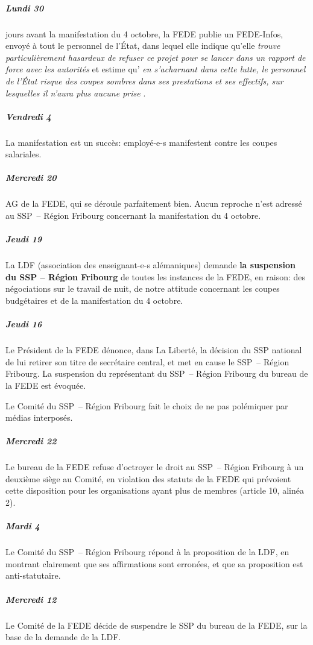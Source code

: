 \subparagraph{Lundi 30}%
 jours avant la manifestation du 4 octobre, la FEDE publie un FEDE-Infos, envoyé à tout le
	personnel de l'État, dans lequel elle indique qu'elle
		\og \emph{trouve particulièrement hasardeux de refuser ce projet pour se lancer dans un
			rapport de force avec les autorités} \fg
	et estime qu'%
		\og \emph{en s'acharnant dans cette lutte, le personnel de l'État risque des coupes sombres
		dans ses prestations et ses effectifs, sur lesquelles il n'aura plus aucune prise} \fg.

\subparagraph{Vendredi 4}%
La manifestation est un succès:  employé-e-s manifestent contre les coupes salariales.

\subparagraph{Mercredi 20}%
AG de la FEDE, qui se déroule parfaitement bien.
Aucun reproche n'est adressé au SSP~– Région Fribourg concernant la manifestation du 4 octobre.

\subparagraph{Jeudi 19}%
La LDF (association des enseignant-e-s alémaniques)
demande \textbf{la suspension du SSP – Région Fribourg} de toutes les instances de la FEDE,
	en raison:
des négociations sur le travail de nuit, de notre attitude concernant les \og coupes budgétaires \fg
	et de la manifestation du 4 octobre.

\subparagraph{Jeudi 16}%
Le Président de la FEDE dénonce,
	dans La Liberté,
	la décision du SSP national de lui retirer son titre de secrétaire central,
	et met en cause le SSP~– Région Fribourg.
La suspension du représentant du SSP~– Région Fribourg du bureau de la FEDE est évoquée.

Le Comité du SSP~– Région Fribourg fait le choix de ne pas polémiquer par médias interposés.

\subparagraph{Mercredi 22}%
Le bureau de la FEDE refuse d'octroyer le droit au SSP~– Région Fribourg à un deuxième siège au
	Comité, en violation des statuts de la FEDE qui prévoient cette disposition pour les organisations
	ayant plus de  membres (article 10, alinéa 2).

\subparagraph{Mardi 4}%
Le Comité du SSP~– Région Fribourg répond à la proposition de la LDF,
	en montrant clairement que ses affirmations sont erronées,
	et que sa proposition est anti-statutaire.

\subparagraph{Mercredi 12}%
Le Comité de la FEDE décide de suspendre le SSP du bureau de la FEDE,
	sur la base de la demande de la LDF.


